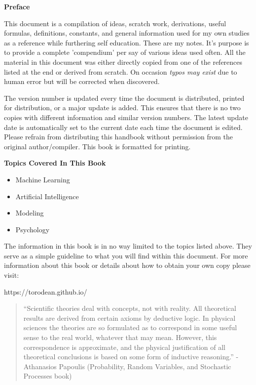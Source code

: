 \begin{center}
	\textbf{Preface}
\end{center}

This document is a compilation of ideas, scratch work, derivations, useful formulas, definitions, constants, and general information used for my own studies as a reference while furthering self education. These are my notes. It's purpose is to provide a complete 'compendium' per say of various ideas used often. All the material in this document was either directly copied from one of the references listed at the end or derived from scratch. On occasion \textit{typos may exist} due to human error but will be corrected when discovered.
	
The version number is updated every time the document is distributed, printed for distribution, or a major update is added. This ensures that there is no two copies with different information and similar version numbers. The latest update date is automatically set to the current date each time the document is edited. Please refrain from distributing this handbook without permission from the original author/compiler. This book is formatted for printing.

\begin{center}
	\textbf{Topics Covered In This Book}
\end{center}

\begin{multicols}{2}
\begin{itemize}
	\item Machine Learning
	\item Artificial Intelligence
	\item Modeling
	\item Psychology
\end{itemize} 
\end{multicols}

The information in this book is in no way limited to the topics listed above. They serve as a simple guideline to what you will find within this document. For more information about this book or details about how to obtain your own copy please visit:
\begin{center}
	https://torodean.github.io/
\end{center}

\begin{quotation}
``Scientific theories deal with concepts, not with reality. All theoretical results are derived from certain axioms by deductive logic. In physical sciences the theories are so formulated as to correspond in some useful sense to the real world, whatever that may mean. However, this correspondence is approximate, and the physical justification of all theoretical conclusions is based on some form of inductive reasoning.'' - Athanasios Papoulis (Probability, Random Variables, and Stochastic Processes book)
\end{quotation}

